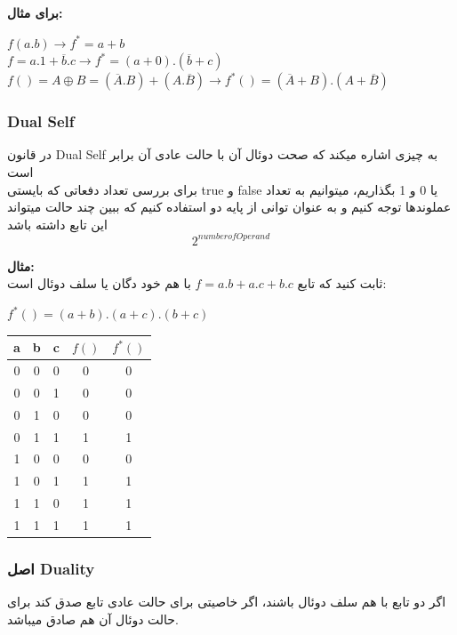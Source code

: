\documentclass[20pt, a4paper]{article}
\begin{document}
\raggedleft
\justifying
\textbf{برای مثال:}\\

\raggedright
$f(a.b) \rightarrow f^{*} = a+b$\\
$f = a.1 + \overline{b}.c \rightarrow f^{*}=(a+0) . (\overline{b}+c) $\\
$f()= A \oplus B = (\overline{A}.B) + (A.\overline{B}) \rightarrow f^{*}()= (\overline{A}+B) . (A+\overline{B})$


\raggedleft
\justifying
\subsubsection{Dual Self}
در قانون Dual Self به چیزی اشاره میکند که صحت دوئال آن با حالت عادی آن برابر است\\
برای بررسی تعداد دفعاتی که بایستی true و false یا 0 و 1 بگذاریم، میتوانیم به تعداد عملوندها توجه کنیم و به عنوان توانی از پایه دو استفاده کنیم که ببین چند حالت میتواند این تابع داشته باشد\\
\begin{equation}
	2^{number of Operand}
\end{equation}


\textbf{مثال:}\\
ثابت کنید که تابع
$f=a.b + a.c + b.c$
با هم خود دگان یا سلف دوئال است:\\

\raggedright
$f^{*}() = (a+b).(a+c).(b+c)$

\center
\begin{LTR}
\begin{tabular}{ c c c | c | c}
	a & b & c & $f()$ & $f^{*}()$\\
	\hline
	0 & 0 & 0 & 0 & 0 \\ 				
	0 & 0 & 1 & 0 & 0\\
	0 & 1 & 0 & 0 & 0\\
	0 & 1 & 1 & 1 & 1\\
	1 & 0 & 0 & 0 & 0\\
	1 & 0 & 1 & 1 & 1\\
	1 & 1 & 0 & 1 & 1\\
	1 & 1 & 1 & 1 & 1\\
\end{tabular}
\end{LTR}
\raggedleft
\justifying

\subsubsection{اصل Duality}
اگر دو تابع با هم سلف دوئال باشند، اگر خاصیتی برای حالت عادی تابع صدق کند برای حالت دوئال آن هم صادق میباشد.\\
\end{document}
